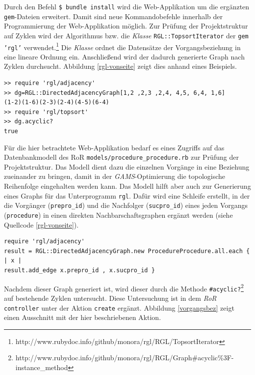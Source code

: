 \documentclass[a4paper,12pt,parskip,bibtotoc,liststotoc]{article}
\begin{document}
Durch den Befehl \texttt{\$ bundle install} wird die Web-Applikation um die ergänzten \texttt{gem}-Dateien erweitert. Damit sind neue Kommandobefehle innerhalb der Programmierung der Web-Applikation möglich. Zur Prüfung der Projektstruktur auf Zyklen wird der Algorithmus bzw. die \textit{Klasse} \texttt{RGL::TopsortIterator} der \texttt{gem 'rgl'} verwendet.\footnote{http://www.rubydoc.info/github/monora/rgl/RGL/TopsortIterator} Die \textit{Klasse} ordnet die Datensätze der Vorgangsbeziehung in eine lineare Ordnung ein. Anschließend wird der dadurch generierte Graph nach Zyklen durchsucht. Abbildung \ref{rgl-vonseite} zeigt dies anhand eines Beispiels.
\begin{lstlisting}[caption=Prüfung auf Zyklen mittels des Unterprogramms \glqq rgl\grqq, style=Listing, label=rgl-vonseite]
>> require 'rgl/adjacency'
>> dg=RGL::DirectedAdjacencyGraph[1,2 ,2,3 ,2,4, 4,5, 6,4, 1,6]
(1-2)(1-6)(2-3)(2-4)(4-5)(6-4)
>> require 'rgl/topsort'
>> dg.acyclic?
true
\end{lstlisting}

Für die hier betrachtete Web-Applikation bedarf es eines Zugriffs auf das Datenbankmodell des RoR \texttt{models/procedure\_procedure.rb} zur Prüfung der Projektstruktur. Das Modell dient dazu die einzelnen Vorgänge in eine Beziehung zueinander zu bringen, damit in der \textit{GAMS}-Optimierung die topologische Reihenfolge eingehalten werden kann. Das Modell hilft aber auch zur Generierung eines Graphs für das Unterprogramm \texttt{rgl}. Dafür wird eine Schleife erstellt, in der die Vorgänger (\texttt{prepro\_id}) und die Nachfolger (\texttt{sucpro\_id}) eines jeden Vorgangs (\texttt{procedure}) in einen direkten Nachbarschaftsgraphen ergänzt werden (siehe Quellcode \ref{rgl-vonseite}).

\begin{lstlisting}[caption=Erstellung eines Graphen mittels des Unterprogramms \glqq rgl\grqq, style=Listing, label=rgl-vonseite]
require 'rgl/adjacency'
result = RGL::DirectedAdjacencyGraph.new ProcedureProcedure.all.each { | x |
result.add_edge x.prepro_id , x.sucpro_id }
\end{lstlisting}

Nachdem dieser Graph generiert ist, wird dieser durch die Methode \texttt{\#acyclic?}\footnote{http://www.rubydoc.info/github/monora/rgl/RGL/Graph\#acyclic\%3F-instance\_method} auf bestehende Zyklen untersucht. Diese Untersuchung ist in dem \textit{RoR} \texttt{controller} unter der Aktion \texttt{create} ergänzt. Abbildung \ref{vorgangsbez} zeigt einen Ausschnitt mit der hier beschriebenen Aktion.

\end{document}
